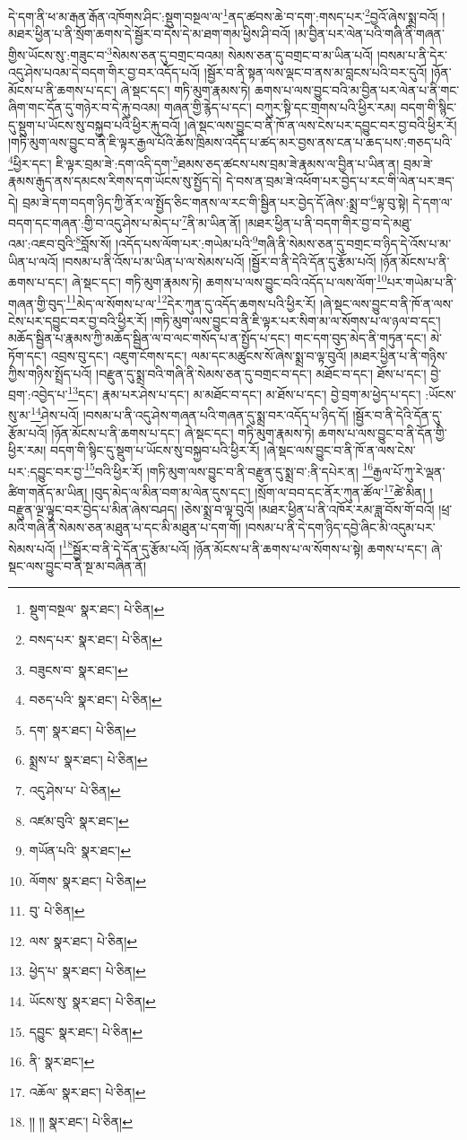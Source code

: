 དེ་དག་ནི་ཕ་མ་རྒན་རྒོན་འཁོགས་ཤིང་:སྡུག་བསྔལ་ལ་\footnote{སྡུག་བསྔལ་  སྣར་ཐང་།  པེ་ཅིན། }ནད་ཚབས་ཆེ་བ་དག་:གསད་པར་\footnote{བསད་པར་  སྣར་ཐང་།  པེ་ཅིན། }བྱའོ་ཞེས་སྨྲ་བའོ། །མཐར་ཕྱིན་པ་ནི་སྲོག་ཆགས་དེ་སྦྱོར་བ་དེས་དེ་མ་ཐག་གམ་ཕྱིས་ཤི་བའོ། །མ་བྱིན་པར་ལེན་པའི་གཞི་ནི་གཞན་གྱིས་ཡོངས་སུ་:གཟུང་བ་\footnote{བཟུངས་བ་  སྣར་ཐང་། }སེམས་ཅན་དུ་བགྲང་བའམ། སེམས་ཅན་དུ་བགྲང་བ་མ་ཡིན་པའོ། །བསམ་པ་ནི་དེར་འདུ་ཤེས་པའམ་དེ་བདག་གིར་བྱ་བར་འདོད་པའོ། །སྦྱོར་བ་ནི་སྟན་ལས་ལྡང་བ་ནས་མ་བླངས་པའི་བར་དུའོ། །ཉོན་མོངས་པ་ནི་ཆགས་པ་དང་། ཞེ་སྡང་དང་། གཏི་མུག་རྣམས་ཏེ། ཆགས་པ་ལས་བྱུང་བའི་མ་བྱིན་པར་ལེན་པ་ནི་གང་ཞིག་གང་དོན་དུ་གཉེར་བ་དེ་རྐུ་བའམ། གཞན་གྱི་རྙེད་པ་དང་། བཀུར་སྟི་དང་གྲགས་པའི་ཕྱིར་རམ། བདག་གི་སྙིང་དུ་སྡུག་པ་ཡོངས་སུ་བསྐྱབ་པའི་ཕྱིར་རྐུ་བའོ། །ཞེ་སྡང་ལས་བྱུང་བ་ནི་ཁོ་ན་ལས་ངེས་པར་དབྱུང་བར་བྱ་བའི་ཕྱིར་རོ། །གཏི་མུག་ལས་བྱུང་བ་ནི་ཇི་ལྟར་རྒྱལ་པོའི་ཆོས་ཁྲིམས་འདོད་པ་ཚད་མར་བྱས་ནས་ངན་པ་ཆད་པས་:གཅད་པའི་\footnote{བཅད་པའི་  སྣར་ཐང་།  པེ་ཅིན། }ཕྱིར་དང་། ཇི་ལྟར་བྲམ་ཟེ་:དག་འདི་དག་\footnote{དག་  སྣར་ཐང་།  པེ་ཅིན། }ཐམས་ཅད་ཚངས་པས་བྲམ་ཟེ་རྣམས་ལ་བྱིན་པ་ཡིན་ན། བྲམ་ཟེ་རྣམས་རྒུད་ནས་དམངས་རིགས་དག་ཡོངས་སུ་སྤྱོད་དེ། དེ་བས་ན་བྲམ་ཟེ་འཕོག་པར་བྱེད་པ་རང་གི་ལེན་པར་ཟད་དེ། བྲམ་ཟེ་དག་བདག་ཉིད་ཀྱི་ནོར་ལ་སྤྱོད་ཅིང་གནས་ལ་རང་གི་སྦྱིན་པར་བྱེད་དོ་ཞེས་:སྨྲ་བ་\footnote{སྨྲས་པ་  སྣར་ཐང་།  པེ་ཅིན། }ལྟ་བུ་སྟེ། དེ་དག་ལ་བདག་དང་གཞན་:གྱི་བ་འདུ་ཤེས་པ་མེད་པ་\footnote{འདུ་ཤེས་པ་  པེ་ཅིན། }ནི་མ་ཡིན་ནོ། །མཐར་ཕྱིན་པ་ནི་བདག་གིར་བྱ་བ་དེ་མཐུ་འམ་:འཇབ་བུའི་\footnote{འཛམ་བུའི་  སྣར་ཐང་། }བློས་སོ། །འདོད་པས་ལོག་པར་:གཡེམ་པའི་\footnote{གཡོན་པའི་  སྣར་ཐང་། }གཞི་ནི་སེམས་ཅན་དུ་བགྲང་བ་ཉིད་དེ་འོས་པ་མ་ཡིན་པ་ལའོ། །བསམ་པ་ནི་འོས་པ་མ་ཡིན་པ་ལ་སེམས་པའོ། །སྦྱོར་བ་ནི་དེའི་དོན་དུ་རྩོམ་པའོ། །ཉོན་མོངས་པ་ནི་ཆགས་པ་དང་། ཞེ་སྡང་དང་། གཏི་མུག་རྣམས་ཏེ། ཆགས་པ་ལས་བྱུང་བའི་འདོད་པ་ལས་ལོག་\footnote{ལོགས་  སྣར་ཐང་།  པེ་ཅིན། }པར་གཡེམ་པ་ནི་གཞན་གྱི་བུད་\footnote{བུ་  པེ་ཅིན། }མེད་ལ་སོགས་པ་ལ་\footnote{ལས་  སྣར་ཐང་།  པེ་ཅིན། }དེར་ཀུན་དུ་འདོད་ཆགས་པའི་ཕྱིར་རོ། །ཞེ་སྡང་ལས་བྱུང་བ་ནི་ཁོ་ན་ལས་ངེས་པར་དབྱུང་བར་བྱ་བའི་ཕྱིར་རོ། །གཏི་མུག་ལས་བྱུང་བ་ནི་ཇི་ལྟར་པར་སིག་མ་ལ་སོགས་པ་ལ་ཉལ་བ་དང་། མཆོད་སྦྱིན་པ་རྣམས་ཀྱི་མཆོད་སྦྱིན་ལ་བ་ལང་གསོད་པ་ན་སྤྱོད་པ་དང་། གང་དག་བུད་མེད་ནི་གཏུན་དང་། མེ་ཏོག་དང་། འབྲས་བུ་དང་། འཇུག་ངོགས་དང་། ལམ་དང་མཚུངས་སོ་ཞེས་སྨྲ་བ་ལྟ་བུའོ། །མཐར་ཕྱིན་པ་ནི་གཉིས་ཀྱིས་གཉིས་སྤྲོད་པའོ། །བརྫུན་དུ་སྨྲ་བའི་གཞི་ནི་སེམས་ཅན་དུ་བགྲང་བ་དང་། མཐོང་བ་དང་། ཐོས་པ་དང་། བྱེ་བྲག་:འབྱེད་པ་\footnote{ཕྱེད་པ་  སྣར་ཐང་།  པེ་ཅིན། }དང་། རྣམ་པར་ཤེས་པ་དང་། མ་མཐོང་བ་དང་། མ་ཐོས་པ་དང་། བྱེ་བྲག་མ་ཕྱེད་པ་དང་། :ཡོངས་སུ་མ་\footnote{ཡོངས་སུ་  སྣར་ཐང་།  པེ་ཅིན། }ཤེས་པའོ། །བསམ་པ་ནི་འདུ་ཤེས་གཞན་པའི་གཞན་དུ་སྨྲ་བར་འདོད་པ་ཉིད་དོ། །སྦྱོར་བ་ནི་དེའི་དོན་དུ་རྩོམ་པའོ། །ཉོན་མོངས་པ་ནི་ཆགས་པ་དང་། ཞེ་སྡང་དང་། གཏི་མུག་རྣམས་ཏེ། ཆགས་པ་ལས་བྱུང་བ་ནི་དོན་གྱི་ཕྱིར་རམ། བདག་གི་སྙིང་དུ་སྡུག་པ་ཡོངས་སུ་བསྐྱབ་པའི་ཕྱིར་རོ། །ཞེ་སྡང་ལས་བྱུང་བ་ནི་ཁོ་ན་ལས་ངེས་པར་:དབྱུང་བར་བྱ་\footnote{དབྱུང་  སྣར་ཐང་།  པེ་ཅིན། }བའི་ཕྱིར་རོ། །གཏི་མུག་ལས་བྱུང་བ་ནི་བརྫུན་དུ་སྨྲ་བ་:ནི་དཔེར་ན། \footnote{ནི་  སྣར་ཐང་། }རྒྱལ་པོ་ཀུ་རེ་ལྡན་ཚིག་གནོད་མ་ཡིན། །བུད་མེད་ལ་མིན་བག་མ་ལེན་དུས་དང་། །སྲོག་ལ་བབ་དང་ནོར་ཀུན་ཚོལ་\footnote{འཆོལ་  སྣར་ཐང་།  པེ་ཅིན། }ཚེ་མིན། །བརྫུན་ལྔ་ལྟུང་བར་བྱེད་པ་མིན་ཞེས་བཤད། །ཅེས་སྨྲ་བ་ལྟ་བུའོ། །མཐར་ཕྱིན་པ་ནི་འཁོར་རམ་ཟླ་བོས་གོ་བའོ། །ཕྲ་མའི་གཞི་ནི་སེམས་ཅན་མཐུན་པ་དང་མི་མཐུན་པ་དག་གོ། །བསམ་པ་ནི་དེ་དག་ཉིད་དབྱེ་ཞིང་མི་འདུམ་པར་སེམས་པའོ། །\footnote{།། །།  སྣར་ཐང་།  པེ་ཅིན། }སྦྱོར་བ་ནི་དེ་དོན་དུ་རྩོམ་པའོ། །ཉོན་མོངས་པ་ནི་ཆགས་པ་ལ་སོགས་པ་སྟེ། ཆགས་པ་དང་། ཞེ་སྡང་ལས་བྱུང་བ་ནི་སྔ་མ་བཞིན་ནོ། 